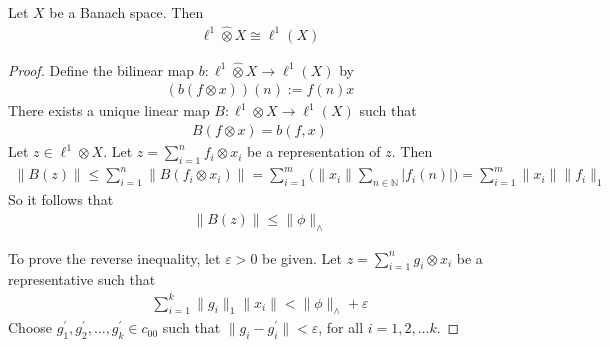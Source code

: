 \begin{theorem}
  Let $X$ be a Banach space. Then
  \begin{align*}
    \ell^{1} \hat{\otimes} X \cong \ell^{1}(X)
  \end{align*}
\end{theorem}
\begin{proof}
  Define the bilinear map $b: \ell^{1} \hat{\otimes} X \to \ell^{1}(X)$ by
  \begin{align*}
    (b(f \otimes x))(n) := f(n)x
  \end{align*}
  There exists a unique linear map $B: \ell^{1}\otimes X \to
  \ell^{1}(X)$ such that
  \begin{align*}
    B(f \otimes x) = b(f, x)
  \end{align*}
  Let $z \in \ell^{1}\otimes X$. Let $z = \sum_{i = 1}^{n} f_i
  \otimes x_i$ be a representation of $z$. Then
  \begin{align*}
    \|B(z)\| \le \sum_{i = 1}^{n} \|B(f_i \otimes x_i)\| = \sum_{i =
    1}^{ m} \Big( \|x_i\| \sum_{n \in \mathbb{N}} |f_i(n)|\Big) =
    \sum_{i = 1}^{m} \|x_i\| \|f_i\|_1
  \end{align*}
  So it follows that
  \begin{align*}
    \|B(z)\| \le \|\phi\|_{\wedge}
  \end{align*}

  To prove the reverse inequality, let $\varepsilon > 0$ be given.
  Let $z = \sum_{i = 1}^{n} g_i \otimes x_i$ be a representative such that
  \begin{align*}
    \sum_{i = 1}^{k} \|g_i\|_1 \|x_i\| < \|\phi\|_{\wedge} + \varepsilon
  \end{align*}
  Choose $g_1^\prime , g_2^\prime , \ldots , g_k^\prime \in c_{00}$
  such that $\|g_i - g_i^\prime\| < \varepsilon$, for all $i = 1, 2, \ldots k$.
\end{proof}
